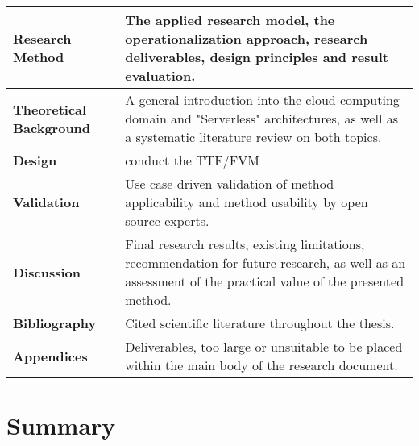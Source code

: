 \begin{center}
\begin{tabular}{ | m{11em} | m{23em}| } 
\hline
 \textbf{Research Method} & 
 The applied research model, the operationalization approach, research deliverables, design principles and result evaluation.  \\
 \hline 
 
 \textbf{Theoretical Background} & 
 A general introduction into the cloud-computing domain and "Serverless" architectures, as well as a systematic literature review on both topics. \\
 \hline 
 
 \textbf{Design} & 
 conduct the TTF/FVM \\
 \hline 
 
 \textbf{Validation} & 
 Use case driven validation of method applicability and method usability by open source experts. \\
 \hline 
 
 \textbf{Discussion} & 
 Final research results, existing limitations, recommendation for future research, as well as an assessment of the practical value of the presented method. \\
 \hline 
 
 \textbf{Bibliography} & 
 Cited scientific literature throughout the thesis. \\
 \hline 
 
 \textbf{Appendices} & 
 Deliverables, too large or unsuitable to be placed within the main body of the research document. \\
\hline
\end{tabular}
\end{center}


\section{Summary}
